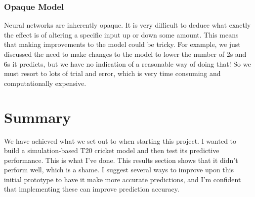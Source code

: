 \subsubsection{Opaque Model}

Neural networks are inherently opaque. It is very difficult to deduce what exactly the effect is of altering a specific input up or down some amount. This means that making improvements to the model could be tricky. For example, we just discussed the need to make changes to the model to lower the number of 2s and 6s it predicts, but we have no indication of a reasonable way of doing that! So we must resort to lots of trial and error, which is very time consuming and computationally expensive.

\section{Summary}

We have achieved what we set out to when starting this project. I wanted to build a simulation-based T20 cricket model and then test its predictive performance. This is what I've done. This results section shows that it didn't perform well, which is a shame. I suggest several ways to improve upon this initial prototype to have it make more accurate predictions, and I'm confident that implementing these can improve prediction accuracy.